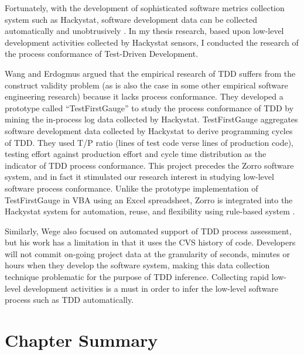 Fortunately, with the development of sophisticated software 
metrics collection system such as Hackystat, software 
development data can be collected automatically and unobtrusively \cite{Hackystat,csdl2-01-12,csdl2-01-13,csdl2-02-07}. In my thesis 
research, based upon low-level development activities collected by 
Hackystat sensors, I conducted the research of the process conformance 
of Test-Driven Development. 

Wang and Erdogmus \cite{Wang:04} argued that the empirical research 
of TDD suffers from the construct validity problem (as is also the 
case in some other empirical software engineering research) because 
it lacks process conformance. They developed a prototype called 
``TestFirstGauge'' to study the process conformance 
of TDD by mining the in-process log data collected by Hackystat. 
TestFirstGauge aggregates software development data collected
by Hackystat to derive programming cycles of TDD. They used T/P ratio 
(lines of test code verse lines of production code), testing effort 
against production effort and cycle time distribution as the indicator 
of TDD process conformance. This project precedes the Zorro software 
system\cite{csdl2-06-02}, and in fact it stimulated our research interest 
in studying low-level software process conformance. Unlike the
prototype implementation of TestFirstGauge in VBA using an Excel
spreadsheet, Zorro is integrated into the Hackystat system for automation,
reuse, and flexibility using rule-based system \cite{Friedman-Hill:03}.

Similarly, Wege \cite{Wege:04} also focused on automated support of TDD
process assessment, but his work has a limitation in that it uses the CVS
history of code. Developers will not commit on-going project data at the
granularity of seconds, minutes or hours when they develop the software
system, making this data collection technique problematic for the purpose
of TDD inference. Collecting rapid low-level development activities is
a must in order to infer the low-level software process such as TDD
automatically.


\section{Chapter Summary}

